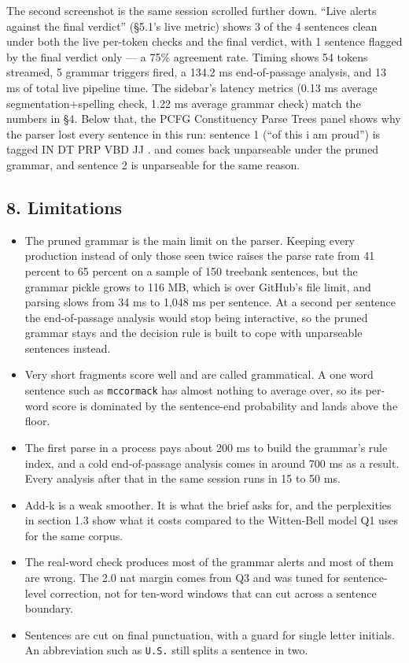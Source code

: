 \documentclass[11pt,a4paper]{article}
\begin{document}
The second screenshot is the same session scrolled further down. ``Live alerts against the final verdict'' (\S{}5.1's live metric) shows 3 of the 4 sentences clean under both the live per-token checks and the final verdict, with 1 sentence flagged by the final verdict only --- a 75\% agreement rate. Timing shows 54 tokens streamed, 5 grammar triggers fired, a 134.2 ms end-of-passage analysis, and 13 ms of total live pipeline time. The sidebar's latency metrics (0.13 ms average segmentation+spelling check, 1.22 ms average grammar check) match the numbers in \S{}4. Below that, the PCFG Constituency Parse Trees panel shows why the parser lost every sentence in this run: sentence 1 (``of this i am proud'') is tagged IN DT PRP VBD JJ . and comes back unparseable under the pruned grammar, and sentence 2 is unparseable for the same reason.

\subsection*{8. Limitations}

\begin{itemize}
\item The pruned grammar is the main limit on the parser. Keeping every production instead of only those seen twice raises the parse rate from 41 percent to 65 percent on a sample of 150 treebank sentences, but the grammar pickle grows to 116 MB, which is over GitHub's file limit, and parsing slows from 34 ms to 1,048 ms per sentence. At a second per sentence the end-of-passage analysis would stop being interactive, so the pruned grammar stays and the decision rule is built to cope with unparseable sentences instead.
\item Very short fragments score well and are called grammatical. A one word sentence such as \texttt{mccormack} has almost nothing to average over, so its per-word score is dominated by the sentence-end probability and lands above the floor.
\item The first parse in a process pays about 200 ms to build the grammar's rule index, and a cold end-of-passage analysis comes in around 700 ms as a result. Every analysis after that in the same session runs in 15 to 50 ms.
\item Add-k is a weak smoother. It is what the brief asks for, and the perplexities in section 1.3 show what it costs compared to the Witten-Bell model Q1 uses for the same corpus.
\item The real-word check produces most of the grammar alerts and most of them are wrong. The 2.0 nat margin comes from Q3 and was tuned for sentence-level correction, not for ten-word windows that can cut across a sentence boundary.
\item Sentences are cut on final punctuation, with a guard for single letter initials. An abbreviation such as \texttt{U.\allowbreak{}S.\allowbreak{}} still splits a sentence in two.
\end{itemize}
\end{document}
